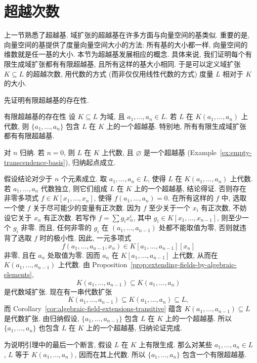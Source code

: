 \section{超越次数}\label{sec:transcendence-degree}

上一节熟悉了超越基. 域扩张的超越基在许多方面与向量空间的基类似. 重要的是, 向量空间的基提供了度量向量空间大小的方法: 所有基的大小都一样, 向量空间的维数就是任一基的大小. 本节为超越基发展相应的概念. 具体来说, 我们证明每个有限生成域扩张都有有限超越基, 且所有这样的基大小相同. 于是可以定义域扩张 $K\subseteq L$ 的超越次数, 用代数的方式 (而非仅仅用线性代数的方式) 度量 $L$ 相对于 $K$ 的大小.

先证明有限超越基的存在性.

\begin{Proposition}{有限超越基的存在性}\leavevmode\label{prop:finite-transcendence-basis-existence}
设 $K\subseteq L$ 为域, 且 $a_{1},\ldots,a_{n}\in L$. 若 $L$ 在 $K(a_{1},\ldots,a_{n})$ 上代数, 则 $\{a_{1},\ldots,a_{n}\}$ 包含 $L$ 在 $K$ 上的一个超越基. 特别地, 所有有限生成域扩张都有有限超越基.
\end{Proposition}
\begin{Proof}
对 $n$ 归纳. 若 $n=0$, 则 $L$ 在 $K$ 上代数, 且 $\varnothing$ 是一个超越基 (Example~\ref{ex:empty-transcendence-basis}), 归纳起点成立.

假设结论对少于 $n$ 个元素成立. 取 $a_{1},\ldots,a_{n}\in L$, 使得 $L$ 在 $K(a_{1},\ldots,a_{n})$ 上代数. 若 $a_{1},\ldots,a_{n}$ 代数独立, 则它们组成 $L$ 在 $K$ 上的一个超越基, 结论得证. 否则存在非零多项式 $f\in K[x_{1},\ldots,x_{n}]$, 使得 $f(a_{1},\ldots,a_{n})=0$. 在所有这样的 $f$ 中, 选取一个使 $f$ 关于尽可能少的变量有正次数. 因为 $f$ 至少关于一个 $x_{i}$ 有正次数, 不妨设它关于 $x_{n}$ 有正次数. 若写作 $f=\sum g_{i}x_{n}^{i}$, 其中 $g_{i}\in K[x_{1},\ldots,x_{n-1}]$, 则至少一个 $g_{i}$ 非零. 而且, 任何非零的 $g_{i}$ 在 $(a_{1},\ldots,a_{n-1})$ 处都不能取值为零, 否则就违背了选取 $f$ 时的极小性. 因此, 一元多项式
\[
  f(a_{1},\ldots,a_{n-1},x_{n})\in K[a_{1},\ldots,a_{n-1}][x_{n}]
\]
非零, 且在 $a_{n}$ 处取值为零. 因而 $a_{n}$ 在 $K[a_{1},\ldots,a_{n-1}]$ 上代数, 从而在 $K(a_{1},\ldots,a_{n-1})$ 上代数. 由 Proposition~\ref{prop:extending-fields-by-algebraic-elements},
\[
  K(a_{1},\ldots,a_{n-1})\subseteq K(a_{1},\ldots,a_{n})
\]
是代数域扩张. 现在有一串代数扩张
\[
  K(a_{1},\ldots,a_{n-1})\subseteq K(a_{1},\ldots,a_{n})\subseteq L,
\]
而 Corollary~\ref{cor:algebraic-field-extensions-transitive} 蕴含 $K(a_{1},\ldots,a_{n-1})\subseteq L$ 是代数扩张. 由归纳假设, $\{a_{1},\ldots,a_{n-1}\}$ 包含 $L$ 在 $K$ 上的一个超越基. 所以 $\{a_{1},\ldots,a_{n}\}$ 也包含 $L$ 在 $K$ 上的一个超越基, 归纳论证完成.

为说明引理中的最后一个断言, 假设 $L$ 在 $K$ 上有限生成. 那么对某些 $a_{1},\ldots,a_{n}\in L$, $L$ 等于 $K(a_{1},\ldots,a_{n})$, 因而在其上代数. 所以 $\{a_{1},\ldots,a_{n}\}$ 包含一个有限超越基.
\end{Proof}

